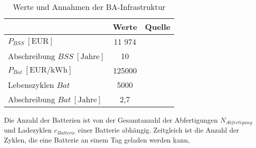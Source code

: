 %
%
%
%
%
\begin{table}[h]
	\begin{center}
    \caption{Werte und Annahmen der BA-Infrastruktur}
	\label{BA_Infrastrukturtab}
	\begin{tabular}{|l|c|c|}
		\hline
		 & \textbf{Werte} & \textbf{Quelle} \\ \hline
		$P_{BSS} ~[\text{EUR}]$ &  11 974  & \cite{guo2020aviation} \\ \hline
      Abschreibung $BSS ~[\text{Jahre}]$&  10  & \cite{salucci2020optimal} \\ \hline
		$P_{Bat} ~[\text{EUR/kWh}]$ & 125000 & \cite{guo2020aviation} \\ \hline
      Lebenszyklen $Bat$ & 5000 & \cite{reimers2018introduction} \\ \hline
      Abschreibung $Bat ~[\text{Jahre}]$& 2,7 & \\ \hline
	\end{tabular}
    \end{center}
\end{table}
Die Anzahl der Batterien ist von der Gesamtanzahl der Abfertigungen $N_{Abfertigung}$ 
und Ladezyklen $c_{Batterie}$ einer Batterie abhängig. 
Zeitgleich ist die Anzahl der Zyklen, die eine Batterie an einem Tag geladen werden kann, 
